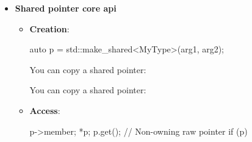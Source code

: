 \documentclass{report}
\begin{document}
\begin{itemize}
\begin{itemize}
                    \bigbreak \noindent 
                    \begin{cppcode}
                        p.swap(p2);
                        std::swap(p, p2);
                    \end{cppcode}
                \item \textbf{Custom deleter}:
                    \bigbreak \noindent 
                    \begin{cppcode}
                        struct FileCloser {
                            void operator()(FILE* file) const {
                                if (file)
                                std::fclose(file);
                            }
                        };

                        std::unique_ptr<FILE, FileCloser> file(
                            std::fopen("data.txt", "r")
                        );
                    \end{cppcode}
                    \bigbreak \noindent 
                    The deleter is part of the unique\_ptr type:
                    \bigbreak \noindent 
                    \begin{cppcode}
                    std::unique_ptr<FILE, FileCloser>
                    \end{cppcode}
            \end{itemize}
        \item \textbf{Shared pointer core api}
            \begin{itemize}
                \item \textbf{Creation}:  
                    \bigbreak \noindent 
                    \begin{cppcode}
                    auto p = std::make_shared<MyType>(arg1, arg2);
                    \end{cppcode}
                    \bigbreak \noindent 
                    You can copy a shared pointer:
                    \bigbreak \noindent 
                    \begin{cppcode}
                    You can copy a shared pointer:
                    \end{cppcode}
                \item \textbf{Access}:
                    \bigbreak \noindent 
                    \begin{cppcode}
                        p->member;
                        *p;
                        p.get();             // Non-owning raw pointer
                        if (p) { }

\end{cppcode}
\end{itemize}
\end{itemize}
\end{document}
